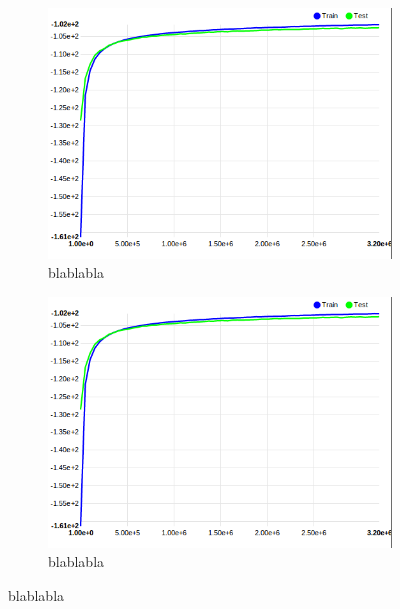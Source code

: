 \begin{figure}
	\centering
	\begin{subfigure}[b]{0.3\textwidth}		
		\includegraphics[scale=0.1]{images/MNIST_28_conv_nocuda.png}
		\caption{blablabla}
	\end{subfigure}

	\begin{subfigure}[b]{0.3\textwidth}		
		\includegraphics[scale=0.1]{images/MNIST_28_conv_nocuda.png}
		\caption{blablabla}
	\end{subfigure}
	\label{label2}
\end{figure}
\newpage


